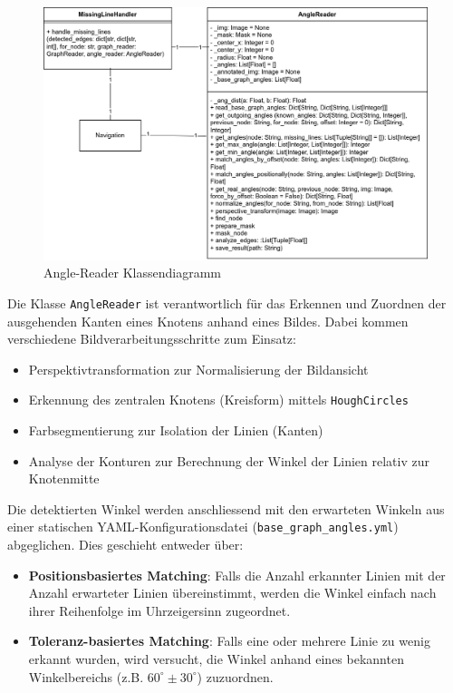 \begin{figure}[H]
    \centering
    \includegraphics[width=1\linewidth]{assets/IT/robot-sw-architecture-node_reader_angles.png}
    \caption{Angle-Reader Klassendiagramm}
    \label{fig:angle-reader-classdiagramm}
\end{figure}

Die Klasse \verb|AngleReader| ist verantwortlich für das Erkennen und Zuordnen der ausgehenden Kanten eines Knotens anhand eines Bildes. Dabei kommen verschiedene Bildverarbeitungsschritte zum Einsatz: 
\begin{itemize}
    \item Perspektivtransformation zur Normalisierung der Bildansicht
    \item Erkennung des zentralen Knotens (Kreisform) mittels \verb|HoughCircles|
    \item Farbsegmentierung zur Isolation der Linien (Kanten)
    \item Analyse der Konturen zur Berechnung der Winkel der Linien relativ zur Knotenmitte
\end{itemize}

Die detektierten Winkel werden anschliessend mit den erwarteten Winkeln aus einer statischen YAML-Konfigurationsdatei (\verb|base_graph_angles.yml|) abgeglichen. Dies geschieht entweder über:
\begin{itemize}
    \item \textbf{Positionsbasiertes Matching}: Falls die Anzahl erkannter Linien mit der Anzahl erwarteter Linien übereinstimmt, werden die Winkel einfach nach ihrer Reihenfolge im Uhrzeigersinn zugeordnet.
    \item \textbf{Toleranz-basiertes Matching}: Falls eine oder mehrere Linie zu wenig erkannt wurden, wird versucht, die Winkel anhand eines bekannten Winkelbereichs (z.B. $60^\circ \pm 30^\circ$) zuzuordnen.
\end{itemize}

